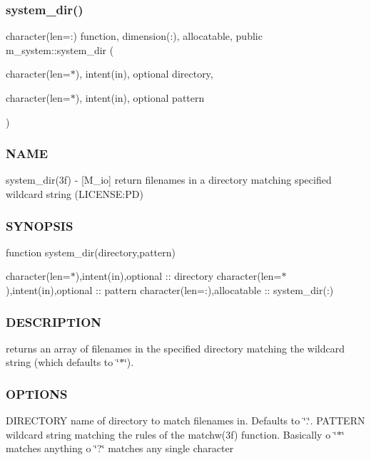 \subsubsection{\texorpdfstring{system\+\_\+dir()}{system\_dir()}}
{\footnotesize\ttfamily character(len=\+:) function, dimension(\+:), allocatable, public m\+\_\+system\+::system\+\_\+dir (\begin{DoxyParamCaption}\item[{character(len=$\ast$), intent(in), optional}]{directory,  }\item[{character(len=$\ast$), intent(in), optional}]{pattern }\end{DoxyParamCaption})}



\subsubsection*{N\+A\+ME}

system\+\_\+dir(3f) -\/ \mbox{[}M\+\_\+io\mbox{]} return filenames in a directory matching specified wildcard string (L\+I\+C\+E\+N\+SE\+:PD) 

\subsubsection*{S\+Y\+N\+O\+P\+S\+IS}

function system\+\_\+dir(directory,pattern)

character(len=$\ast$),intent(in),optional \+:\+: directory character(len=$\ast$),intent(in),optional \+:\+: pattern character(len=\+:),allocatable \+:\+: system\+\_\+dir(\+:)

\subsubsection*{D\+E\+S\+C\+R\+I\+P\+T\+I\+ON}

returns an array of filenames in the specified directory matching the wildcard string (which defaults to \char`\"{}$\ast$\char`\"{}).

\subsubsection*{O\+P\+T\+I\+O\+NS}

D\+I\+R\+E\+C\+T\+O\+RY name of directory to match filenames in. Defaults to \char`\"{}.\char`\"{}. P\+A\+T\+T\+E\+RN wildcard string matching the rules of the matchw(3f) function. Basically o \char`\"{}$\ast$\char`\"{} matches anything o \char`\"{}?\char`\"{} matches any single character

